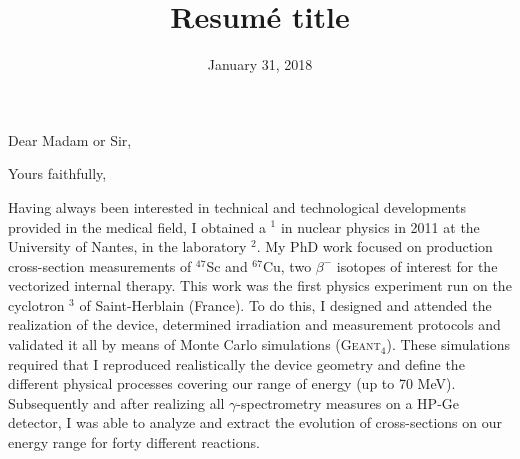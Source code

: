\documentclass[11pt,a4paper,sans]{moderncv}        %
\title{Resumé title}                               %
\begin{document}
\date{January 31, 2018}
\opening{Dear Madam or Sir,}
\closing{Yours faithfully,}
\makelettertitle
\justifying
Having always been interested in technical and technological developments provided in the medical field, I obtained a \href{https://tel.archives-ouvertes.fr/tel-00662649}{\underline{\color{blue}{PhD}}}$^1$ in nuclear physics in 2011 at the University of Nantes, in the laboratory \href{http://www-subatech.in2p3.fr/fr/recherche/nucleaire-et-sante/prisma/presentation}{\underline{\color{blue}{Subatech}}}$^2$.
My PhD work focused on production cross-section measurements of $^{47}$Sc and $^{67}$Cu, two $\beta^-$ isotopes of interest for the vectorized internal therapy.
This work was the first physics experiment run on the cyclotron \href{http://www.cyclotron-nantes.fr/spip.php?rubrique85}{\underline{}}$^3$ of Saint-Herblain (France).
To do this, I designed and attended the realization of the device, determined irradiation and measurement protocols and validated it all by means of Monte Carlo simulations (G\textsc{eant}$_4$).
These simulations required that I reproduced realistically the device geometry and define the different physical processes covering our range of energy (up to 70 MeV).
Subsequently and after realizing all $\gamma$-spectrometry measures on a HP-Ge detector, I was able to analyze and extract the evolution of cross-sections on our energy range for forty different reactions.
\end{document}
